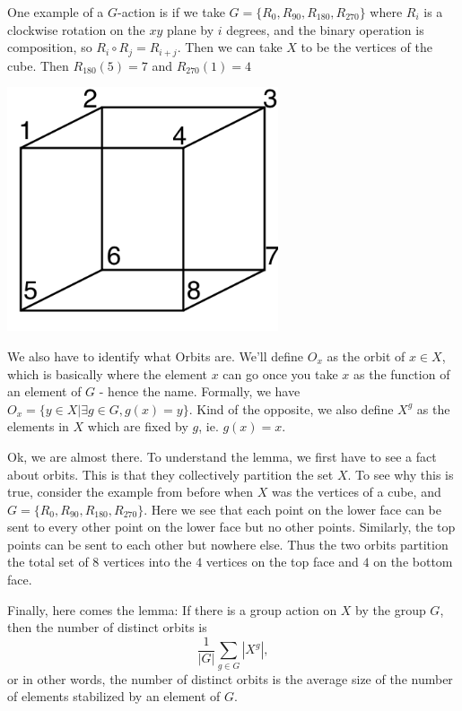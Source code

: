 \documentclass{article}
\begin{document}
One example of a $G$-action is if we take $G=\{R_0,R_{90},R_{180},R_{270}\}$  where $R_i$ is a clockwise rotation on the $xy$ plane by $i$ degrees, and the binary operation is composition, so $R_i \circ R_j = R_{i+j}.$ Then we can take $X$ to be the vertices of the cube. Then $R_{180}(5)=7$ and $R_{270}(1)=4$
\begin{center}
    \includegraphics[width=8cm, scale=1]{nov23/images/Labeled_cube_graph.png}
\end{center}


We also have to identify what Orbits are. We'll define $O_x$ as the orbit of $x\in X$, which is basically where the element $x$ can go once you take $x$ as the function of an element of $G$ - hence the name. Formally, we have $O_x=\{y\in X | \exists g\in G, g(x)=y\}.$ Kind of the opposite, we also define $X^g$ as the elements in $X$ which are fixed by $g$, ie. $g(x) = x$.

Ok, we are almost there. To understand the lemma, we first have to see a fact about orbits. This is that they collectively partition the set $X$. To see why this is true, consider the example from before when $X$ was the vertices of a cube, and $G=\{R_0,R_{90},R_{180},R_{270}\}$. Here we see that each point on the lower face can be sent to every other point on the lower face but no other points. Similarly, the top points can be sent to each other but nowhere else. Thus the two orbits partition the total set of $8$ vertices into the $4$ vertices on the top face and $4$ on the bottom face.

Finally, here comes the lemma: If there is a group action on $X$ by the group $G$, then the number of distinct orbits is $$\frac{1}{|G|}\sum_{g\in G}|X^g|,$$
or in other words, the number of distinct orbits is the average size of the number of elements stabilized by an element of $G$.
\end{document}
